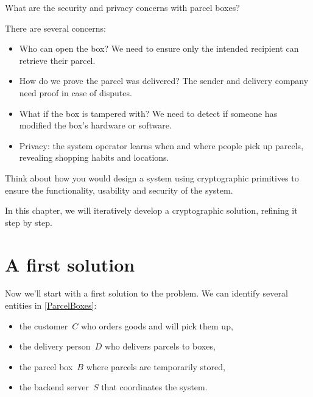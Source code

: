 \begin{exercise}\label{ParcelDrawbacks}
  What are the security and privacy concerns with parcel boxes?
\end{exercise}

There are several concerns:
\begin{itemize}
  \item Who can open the box? We need to ensure only the intended recipient
    can retrieve their parcel.
  \item How do we prove the parcel was delivered? The sender and delivery
    company need proof in case of disputes.
  \item What if the box is tampered with? We need to detect if someone has
    modified the box's hardware or software.
  \item Privacy: the system operator learns when and where people pick up
    parcels, revealing shopping habits and locations.
\end{itemize}

\begin{exercise}
  Think about how you would design a system using cryptographic primitives to
  ensure the functionality, usability and security of the system.
\end{exercise}


In this chapter, we will iteratively develop a cryptographic solution,
refining it step by step.
\chapterminitoc
\section{A first solution}\label{ParcelFirstSolution}

Now we'll start with a first solution to the problem.
We can identify several entities in \cref{ParcelBoxes}:
\begin{itemize}
  \item the customer~\(C\) who orders goods and will pick them up,
  \item the delivery person~\(D\) who delivers parcels to boxes,
  \item the parcel box~\(B\) where parcels are temporarily stored,
  \item the backend server~\(S\) that coordinates the system.
\end{itemize}

